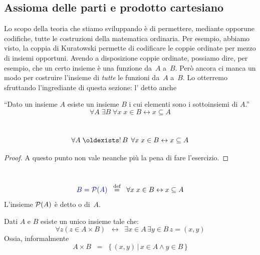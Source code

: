 \subsection{Assioma delle parti e prodotto cartesiano}
Lo scopo della teoria che stiamo sviluppando \`e di permettere, mediante
opporune codifiche, tutte le costruzioni della matematica ordinaria. Per
esempio, abbiamo visto, la coppia di Kuratowski permette di codificare le
coppie ordinate per mezzo di insiemi opportuni. Avendo a disposizione
coppie ordinate, possiamo dire, per esempio, che un certo insieme \`e una
funzione da~$A$ a~$B$. Per\`o ancora ci manca un modo per costruire
l'insieme di \textit{tutte} le funzioni da~$A$ a~$B$. Lo otterremo
sfruttando l'ingrediante di questa sezione: l'
detto anche 

\begin{axiom}
	\label{ax6}
	``Dato un insieme $A$ esiste un insieme $B$ i cui elementi sono i
sottoinsiemi di $A$.''
	\[ \forall A \; \exists B \; \forall x \; x \in B \leftrightarrow x \subseteq A 
		\]
\end{axiom}

\begin{proposition}
\ 
\baselineskip
	\[\forall A \; \existrun B \; \forall x \; x \in B \leftrightarrow x \subseteq A 
		\]
\end{proposition}
\begin{proof}
A questo punto non vale neanche pi\`u la pena di fare l'esercizio.
\end{proof}

\begin{notation}
\ 
\baselineskip
	\[ {\drkblu B = \ps(A)} \;\;\Mydef\;\; \forall x \; x \in B \leftrightarrow x \subseteq A
		\]
L'insieme $\mathcal{P}(A)$ \`e detto \vocab{insieme delle parti} o  di~$A$.
\end{notation}

\begin{proposition}
	Dati $A$ e $B$  esiste un unico insieme  tale che:
	\[ \forall z (z \in A \times B) \;\;\leftrightarrow\;\; \exists {x
\in A} \, \exists {y \in B} \, z = (x,y)
		\]
\drkgrn Ossia, informalmente
\[ A\times B \;\;=\;\; \{\,(x,y)\,|\,x\in A \land y\in B\,\} \]
\end{proposition}

